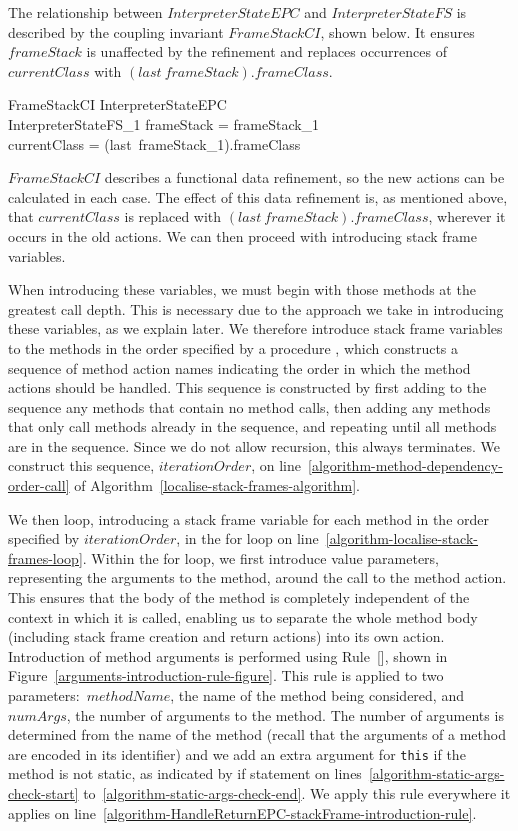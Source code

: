 The relationship between $InterpreterStateEPC$ and
$InterpreterStateFS$ is described by the coupling invariant
$FrameStackCI$, shown below.
It ensures $frameStack$ is unaffected by the refinement and replaces
occurrences of $currentClass$ with $(last~frameStack).frameClass$.
\begin{schema}{FrameStackCI}
  InterpreterStateEPC \\
  InterpreterStateFS_1
\where
  frameStack = frameStack_1 \\
  currentClass = (last~frameStack_1).frameClass
\end{schema}

$FrameStackCI$ describes a functional data refinement, so the new
actions can be calculated in each case.
The effect of this data refinement is, as mentioned above, that
$currentClass$ is replaced with $(last~frameStack).frameClass$,
wherever it occurs in the old actions.
We can then proceed with introducing stack frame variables.

When introducing these variables, we must begin with those methods at
the greatest call depth.
This is necessary due to the approach we take in introducing these
variables, as we explain later.
We therefore introduce stack frame variables to the methods in the
order specified by a procedure , which
constructs a sequence of method action names indicating the order in
which the method actions should be handled.
This sequence is constructed by first adding to the sequence any
methods that contain no method calls, then adding any methods that
only call methods already in the sequence, and repeating until all
methods are in the sequence.
Since we do not allow recursion, this always terminates.
We construct this sequence, $iterationOrder$, on
line~\ref{algorithm-method-dependency-order-call} of
Algorithm~\ref{localise-stack-frames-algorithm}.

We then loop, introducing a stack frame variable for each method in
the order specified by $iterationOrder$, in the for loop on
line~\ref{algorithm-localise-stack-frames-loop}.
Within the for loop, we first introduce value parameters, representing
the arguments to the method, around the call to the method action.
This ensures that the body of the method is completely independent of
the context in which it is called, enabling us to separate the whole
method body (including stack frame creation and return actions) into
its own action.
Introduction of method arguments is performed using
Rule~[], shown in
Figure~\ref{arguments-introduction-rule-figure}.
This rule is applied to two parameters:~$methodName$, the name of the
method being considered, and $numArgs$, the number of arguments to the
method.
The number of arguments is determined from the name of the method
(recall that the arguments of a method are encoded in its identifier)
and we add an extra argument for \texttt{this} if the method is not
static, as indicated by if statement on
lines~\ref{algorithm-static-args-check-start}
to~\ref{algorithm-static-args-check-end}.
We apply this rule everywhere it applies on
line~\ref{algorithm-HandleReturnEPC-stackFrame-introduction-rule}.

